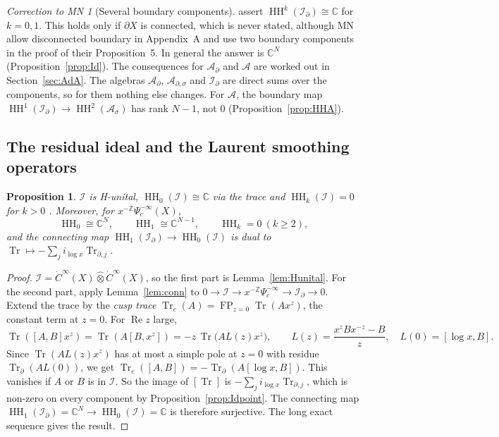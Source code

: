 \documentclass[11pt,oneside,reqno]{article}
\DeclareMathOperator{\HH}{HH}
\DeclareMathOperator{\Tr}{Tr}
\DeclareMathOperator{\FP}{FP}
\newcommand{\C}{\mathbb C}
\newcommand{\Z}{\mathbb Z}
\newcommand{\cA}{\mathcal A}
\newcommand{\cI}{\mathcal I}
\newcommand{\Id}{\mathcal I_\partial}
\newcommand{\As}{\mathcal A_\sigma}
\newcommand{\Ad}{\mathcal A_\partial}
\newcommand{\Ads}{\mathcal A_{\partial,\sigma}}
\newcommand{\Psic}{\Psi_{c}}
\newcommand{\Trd}{\Tr_\partial}
\newcommand{\dCI}{\dot C^\infty}
\newcommand{\lx}{\log x}
\theoremstyle{plain}
\newtheorem{proposition}[theorem]{Proposition}
\theoremstyle{definition}
\theoremstyle{remark}
\newtheorem{correction}[theorem]{Correction to MN}
\begin{document}
\begin{correction}[Several boundary components]\label{corr:components}
\cite[(16), Prop.~6, Lemma~12]{MN} assert \(\HH^k(\Id)\cong\C\) for
\(k=0,1\). This holds only if \(\partial X\) is connected, which is never
stated, although MN allow disconnected boundary in Appendix~A and use two
boundary components in the proof of their Proposition~5. In general the
answer is \(\C^N\) (Proposition~\ref{prop:Id}). The consequences for
\(\Ad\) and \(\cA\) are worked out in Section~\ref{sec:AdA}. The algebras
\(\Ad\), \(\Ads\) and \(\Id\) are direct sums over the components, so for
them nothing else changes. For \(\cA\), the boundary map
\(\HH^1(\Id)\to\HH^2(\As)\) has rank \(N-1\), not \(0\)
(Proposition~\ref{prop:HHA}).
\end{correction}

\subsection{The residual ideal and the Laurent smoothing operators}

\begin{proposition}\label{prop:I}
\(\cI\) is H-unital, \(\HH_0(\cI)\cong\C\) via the trace and
\(\HH_k(\cI)=0\) for \(k>0\) \cite[end of \S4]{MN}. Moreover, for
\(x^{-\Z}\Psic^{-\infty}(X)\),
\[
 \HH_0\cong\C^N,\qquad\HH_1\cong\C^{N-1},\qquad\HH_k=0\ (k\ge2),
\]
and the connecting map \(\HH_1(\Id)\to\HH_0(\cI)\) is dual to
\(\Tr\mapsto-\sum_ji_{\lx}\Tr_{\partial,j}\).
\end{proposition}

\begin{proof}
\(\cI=\dCI(X)\widehat\otimes\dCI(X)\), so the first part is
Lemma~\ref{lem:Hunital}. For the second part, apply
Lemma~\ref{lem:conn} to \(0\to\cI\to x^{-\Z}\Psic^{-\infty}\to\Id\to0\).
Extend the trace by the \emph{cusp trace}
\(\Tr_c(A)=\FP_{z=0}\Tr(Ax^z)\), the constant term at \(z=0\). For
\(\operatorname{Re}z\) large,
\[
 \Tr([A,B]x^z)=\Tr(A[B,x^z])=-z\,\Tr\bigl(AL(z)x^z\bigr),\qquad
 L(z)=\frac{x^zBx^{-z}-B}{z},\quad L(0)=[\lx,B].
\]
Since \(\Tr(AL(z)x^z)\) has at most a simple pole at \(z=0\) with residue
\(\Trd(AL(0))\), we get \(\Tr_c([A,B])=-\Trd(A[\lx,B])\). This vanishes if
\(A\) or \(B\) is in \(\cI\). So the image of \([\Tr]\) is
\(-\sum_ji_{\lx}\Tr_{\partial,j}\), which is non-zero on every component
by Proposition~\ref{prop:Idpoint}. The connecting map
\(\HH_1(\Id)=\C^N\to\HH_0(\cI)=\C\) is therefore surjective. The long
exact sequence gives the result.
\end{proof}
\end{document}

